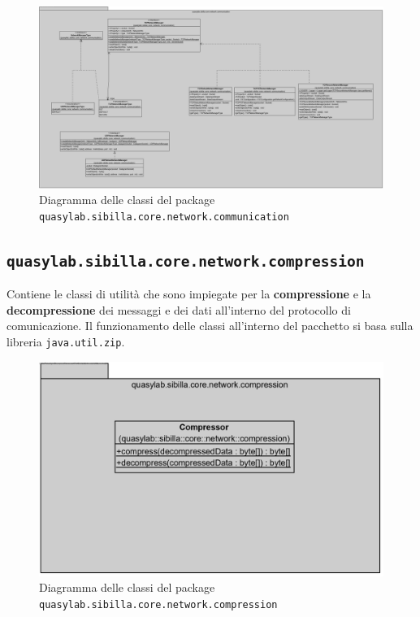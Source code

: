 \begin{figure}[H]
    \includegraphics[width=\linewidth]{images/quasylab.sibilla.core.network.communication.png}
    \captionsetup{justification=centering}
    \caption{Diagramma delle classi del package \texttt{quasylab.sibilla.core.network.communication}}
  \end{figure}

\subsection{\texttt{quasylab.sibilla.core.network.compression}} Contiene le classi di utilità che sono impiegate per la \textbf{compressione} e la \textbf{decompressione} dei messaggi e dei dati all’interno del protocollo di comunicazione. Il funzionamento delle classi all’interno del pacchetto si basa sulla libreria \texttt{java.util.zip}.

\begin{figure}[H]
    \includegraphics[width=\linewidth]{images/quasylab.sibilla.core.network.compression.png}
    \captionsetup{justification=centering}
    \caption{Diagramma delle classi del package \texttt{quasylab.sibilla.core.network.compression}}
  \end{figure}

